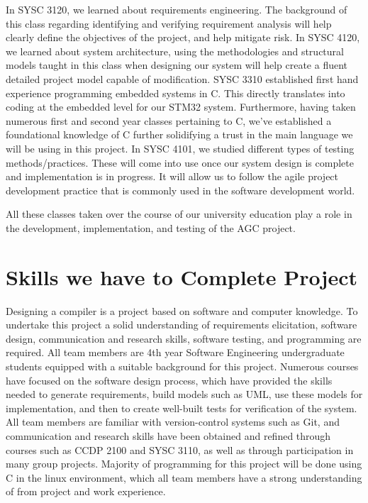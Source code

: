 \documentclass[11pt]{article}
\begin{document}
In SYSC 3120, we learned about requirements engineering. The background of this class regarding identifying and verifying requirement analysis will help clearly define the objectives of the project, and help mitigate risk. In SYSC 4120, we learned about system architecture, using the methodologies and structural models taught in this class when designing our system will help create a fluent detailed project model capable of modification. SYSC 3310 established first hand experience programming embedded systems in C. This directly translates into coding at the embedded level for our STM32 system. Furthermore, having taken numerous first and second year classes pertaining to C, we’ve established a foundational knowledge of C further solidifying a trust in the  main language we will be using in this project. In SYSC 4101, we studied different types of testing methods/practices. These will come into use once our system design is complete and implementation is in progress. It will allow us to follow the agile project development practice that is commonly used in the software development world.

	All these classes taken over the course of our university education play a role in the development, implementation, and testing of the AGC project.


\section{Skills we have to Complete Project}

Designing a compiler is a project based on software and computer knowledge. To undertake this project a solid understanding of requirements elicitation, software design, communication and research skills, software testing, and programming are required.  All team members are 4th year Software Engineering undergraduate students equipped with a suitable background for this project. Numerous courses have focused on the software design process, which have provided the skills needed to generate requirements, build models such as UML, use these models for implementation, and then to create well-built tests for verification of the system. All team members are familiar with version-control systems such as Git, and communication and research skills have been obtained and refined through courses such as CCDP 2100 and SYSC 3110, as well as through participation in many group projects. Majority of programming for this project will be done using C in the linux environment, which all team members have a strong understanding of from project and work experience.
\end{document}
